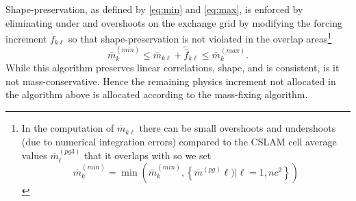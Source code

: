 Shape-preservation, as defined by \eqref{eq:min} and \eqref{eq:max}, is enforced by eliminating under and overshoots on the exchange grid by modifying the forcing increment $\overline{f}_{k\ell}$ so that shape-preservation is not violated in the overlap areas{\footnote{In the computation of $\overline{m}_{k\ell}$ there can be small overshoots and undershoots (due to numerical integration errors) compared to the CSLAM cell average values $\overline{m}^{(pg3)}_\ell$ that it overlaps with so we set
\begin{equation}
\overline{m}_k^{(min)}=\min \left( \overline{m}_k^{(min)},\left\{ \overline{m}^{(pg)}\ell)|\ell=1,nc^2\right\} \right)
\end{equation}}}
\begin{equation}
\overline{m}_k^{(min)} \le \overline{m}_{k\ell}+\widetilde{\overline{f}}_{k\ell} \le \overline{m}_k^{(max)}.
\end{equation}
While this algorithm preserves linear correlations, shape, and is consistent, is it not mass-conservative. Hence the remaining physics increment not allocated in the algorithm above is allocated according to the mass-fixing algorithm.

